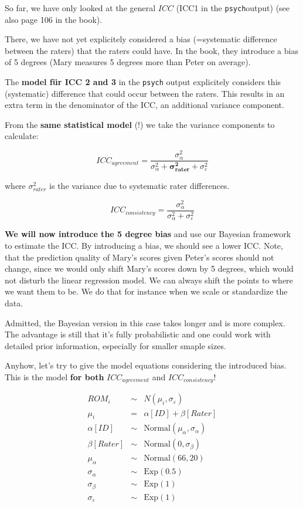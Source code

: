 \documentclass[
]{book}
\begin{document}
So far, we have only looked at the general \textbf{\(ICC\)} (ICC1 in the \texttt{psych}output)
(see also page 106 in the book).

There, we have not yet explicitely considered a bias (=systematic difference
between the raters) that the raters could have. In the book,
they introduce a bias of 5 degrees (Mary measures 5 degrees more than Peter on average).

The \textbf{model für ICC 2 and 3} in the \texttt{psych} output explicitely considers this
(systematic) difference that could occur between the raters.
This results in an extra term in the denominator
of the ICC, an additional variance component.

From the \textbf{same statistical model} (!) we take the variance components to calculate:

\[ICC_{agreement} = \frac{\sigma_{\alpha}^2}{\sigma_{\alpha}^2 + \mathbf{\sigma_{rater}^2} + \sigma_{\varepsilon}^2}\]

where \(\sigma_{rater}^2\) is the variance due to systematic rater differences.

\[ICC_{consistency} = \frac{\sigma_{\alpha}^2}{\sigma_{\alpha}^2 + \sigma_{\varepsilon}^2}\]

\textbf{We will now introduce the 5 degree bias} and use our Bayesian
framework to estimate the ICC.
By introducing a bias, we should see
a lower ICC. Note, that the prediction quality of Mary's scores
given Peter's scores should not change, since we would only shift Mary's scores
down by 5 degrees, which would not disturb the linear regression model. We can
always shift the points to where we want them to be. We do that for instance
when we scale or standardize the data.

Admitted, the Bayesian version in this case takes longer and is more complex.
The advantage is still that it's fully probabilistic and one could work with
detailed prior information, especially for smaller smaple sizes.

Anyhow, let's try to give the model equations considering
the introduced bias. This is the model \textbf{for both}
\(ICC_{agreement}\) and \(ICC_{consistency}\)!

\[
\begin{array}{rcl}
ROM_i &\sim& N(\mu_i, \sigma_{\varepsilon}) \\
\mu_i &=& \alpha[ID] + \beta[Rater] \\
\alpha[ID] &\sim& \text{Normal}(\mu_{\alpha}, \sigma_{\alpha}) \\
\beta[Rater] &\sim& \text{Normal}(0, \sigma_{\beta}) \\
\mu_{\alpha} &\sim& \text{Normal}(66, 20) \\
\sigma_{\alpha} &\sim& \text{Exp}(0.5) \\
\sigma_{\beta} &\sim& \text{Exp}(1) \\
\sigma_{\varepsilon} &\sim& \text{Exp}(1)
\end{array}
\]
\end{document}
